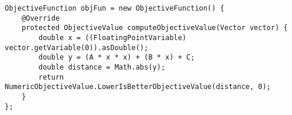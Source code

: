 \verb$ObjectiveFunction objFun = new ObjectiveFunction() {                          $\\
\verb$    @Override                                                                 $\\
\verb$    protected ObjectiveValue computeObjectiveValue(Vector vector) {           $\\
\verb$        double x = ((FloatingPointVariable) vector.getVariable(0)).asDouble();$\\
\verb$        double y = (A * x * x) + (B * x) + C;                                 $\\
\verb$        double distance = Math.abs(y);                                        $\\
\verb$        return NumericObjectiveValue.LowerIsBetterObjectiveValue(distance, 0);$\\
\verb$    }                                                                         $\\
\verb$};                                                                            $\\